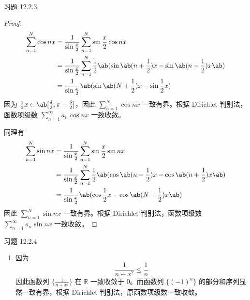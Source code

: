 \begin{problem}
    习题 12.2.3
    \begin{proof}
        $$
        \begin{aligned}
            \sum_{n = 1}^{N} \cos n x & = \frac{1}{\sin \frac{x}{2}} \sum_{n = 1}^{N} \sin \frac{x}{2} \cos n x \\
            & = \frac{1}{\sin \frac{x}{2}} \sum_{n = 1}^{N} \frac{1}{2} \ab(\sin \ab(n + \frac{1}{2}) x - \sin \ab(n - \frac{1}{2}) x\ab) \\
            & = \frac{1}{\sin \frac{x}{2}} \ab(\sin \ab(N + \frac{1}{2}) x - \sin \frac{1}{2} x)
        \end{aligned}
        $$
        因为 $\frac{1}{2} x \in \ab[\frac{\delta}{2}, \pi - \frac{\delta}{2}]$，因此 $\sum\limits_{n = 1}^{N} \cos n x$ 一致有界。根据 Dirichlet 判别法，函数项级数 $\sum\limits_{n = 1}^{\infty} a_n \cos n x$ 一致收敛。

        同理有
        $$
        \begin{aligned}
            \sum_{n = 1}^{N} \sin n x & = \frac{1}{\sin \frac{x}{2}} \sum_{n = 1}^{N} \sin \frac{x}{2} \sin n x \\
            & = \frac{1}{\sin \frac{x}{2}} \sum_{n = 1}^{N} \frac{1}{2} \ab(\cos \ab(n - \frac{1}{2}) x - \cos \ab(n + \frac{1}{2}) x\ab) \\
            & = \frac{1}{\sin \frac{x}{2}} \ab(\cos \frac{1}{2} x - \cos \ab(N + \frac{1}{2}) x\ab)
        \end{aligned}
        $$
        因此 $\sum\limits_{n = 1}^{N} \sin n x$ 一致有界。根据 Dirichlet 判别法，函数项级数 $\sum\limits_{n = 1}^{\infty} a_n \sin n x$ 一致收敛。
    \end{proof}
\end{problem}

\begin{problem}
    习题 12.2.4
    \begin{solution}
        \begin{enumerate}
            \item[\textbf{1)}] 因为
            $$
            \frac{1}{n + x^2} \le \frac{1}{n}
            $$
            因此函数列 $\{\frac{1}{n + x^2}\}$ 在 $\mathbb{R}$ 一致收敛于 $0$。而函数列 $\{(-1)^{n}\}$ 的部分和序列显然一致有界，根据 Dirichlet 判别法，原函数项级数一致收敛。
        \end{enumerate}
    \end{solution}
\end{problem}


